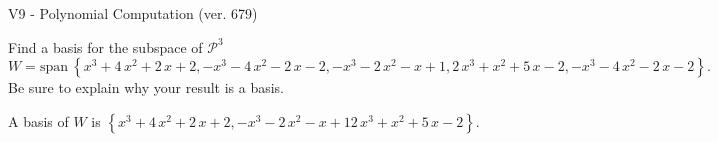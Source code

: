 \begin{exercise}
  \begin{exerciseTitle}V9 - Polynomial Computation (ver. 679)\end{exerciseTitle}
  \begin{exerciseStatement}
    Find a basis for the subspace of \(\mathcal{P}^3\) 
\[W=\mathrm{span}\ \left\{x^{3} + 4 \, x^{2} + 2 \, x + 2 , -x^{3} - 4 \, x^{2} - 2 \, x - 2 , -x^{3} - 2 \, x^{2} - x + 1 , 2 \, x^{3} + x^{2} + 5 \, x - 2 , -x^{3} - 4 \, x^{2} - 2 \, x - 2\right\}.\]
 Be sure to explain why your result is a basis.


  \end{exerciseStatement}
  \begin{exerciseAnswer}
   A basis of \(W\) is  \(\left\{x^{3} + 4 \, x^{2} + 2 \, x + 2 , -x^{3} - 2 \, x^{2} - x + 1 2 \, x^{3} + x^{2} + 5 \, x - 2\right\}\).
  


  \end{exerciseAnswer}
\end{exercise}